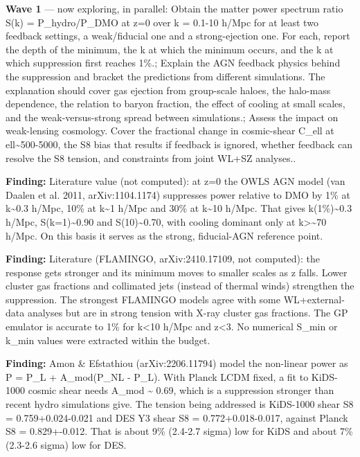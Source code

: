 \documentclass[11pt,a4paper]{article}
\begin{document}
\textbf{Wave 1} --- now exploring, in parallel: Obtain the matter power spectrum ratio S(k) = P\_hydro/P\_DMO at z=0 over k = 0.1-10 h/Mpc for at least two feedback settings, a weak/fiducial one and a strong-ejection one. For each, report the depth of the minimum, the k at which the minimum occurs, and the k at which suppression first reaches 1\%.; Explain the AGN feedback physics behind the suppression and bracket the predictions from different simulations. The explanation should cover gas ejection from group-scale haloes, the halo-mass dependence, the relation to baryon fraction, the effect of cooling at small scales, and the weak-versus-strong spread between simulations.; Assess the impact on weak-lensing cosmology. Cover the fractional change in cosmic-shear C\_ell at ell\textasciitilde{}500-5000, the S8 bias that results if feedback is ignored, whether feedback can resolve the S8 tension, and constraints from joint WL+SZ analyses..

\textbf{Finding:} Literature value (not computed): at z=0 the OWLS AGN model (van Daalen et al. 2011, arXiv:1104.1174) suppresses power relative to DMO by 1\% at k\textasciitilde{}0.3 h/Mpc, 10\% at k\textasciitilde{}1 h/Mpc and 30\% at k\textasciitilde{}10 h/Mpc. That gives k(1\%)\textasciitilde{}0.3 h/Mpc, S(k=1)\textasciitilde{}0.90 and S(10)\textasciitilde{}0.70, with cooling dominant only at k\textgreater{}\textasciitilde{}70 h/Mpc. On this basis it serves as the strong, fiducial-AGN reference point.

\textbf{Finding:} Literature (FLAMINGO, arXiv:2410.17109, not computed): the response gets stronger and its minimum moves to smaller scales as z falls. Lower cluster gas fractions and collimated jets (instead of thermal winds) strengthen the suppression. The strongest FLAMINGO models agree with some WL+external-data analyses but are in strong tension with X-ray cluster gas fractions. The GP emulator is accurate to 1\% for k\textless{}10 h/Mpc and z\textless{}3. No numerical S\_min or k\_min values were extracted within the budget.

\textbf{Finding:} Amon \& Efstathiou (arXiv:2206.11794) model the non-linear power as P = P\_L + A\_mod(P\_NL - P\_L). With Planck LCDM fixed, a fit to KiDS-1000 cosmic shear needs A\_mod \textasciitilde{} 0.69, which is a suppression stronger than recent hydro simulations give. The tension being addressed is KiDS-1000 shear S8 = 0.759+0.024-0.021 and DES Y3 shear S8 = 0.772+0.018-0.017, against Planck S8 = 0.829+-0.012. That is about 9\% (2.4-2.7 sigma) low for KiDS and about 7\% (2.3-2.6 sigma) low for DES.
\end{document}
